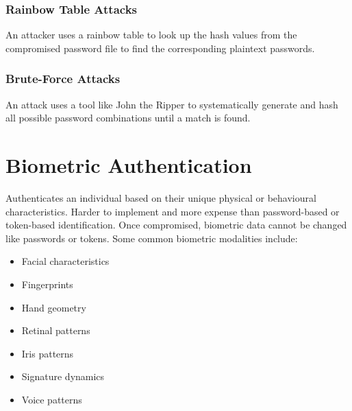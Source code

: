 \documentclass[12pt letter]{report}
\begin{document}
\subsubsection{Rainbow Table Attacks}
An attacker uses a rainbow table to look up the hash values from
the compromised password file to find the corresponding plaintext passwords.

\subsubsection{Brute-Force Attacks}
An attack uses a tool like John the Ripper to systematically generate
and hash all possible password combinations until a match is found.

\section{Biometric Authentication}


Authenticates an individual based on their unique physical or
behavioural characteristics. Harder to implement and more expense
than password-based or token-based identification. Once compromised,
biometric data cannot be changed like passwords or tokens.
Some common biometric modalities include:
\begin{itemize}
  \item Facial characteristics
  \item Fingerprints
  \item Hand geometry
  \item Retinal patterns
  \item Iris patterns
  \item Signature dynamics
  \item Voice patterns
\end{itemize}
\end{document}
